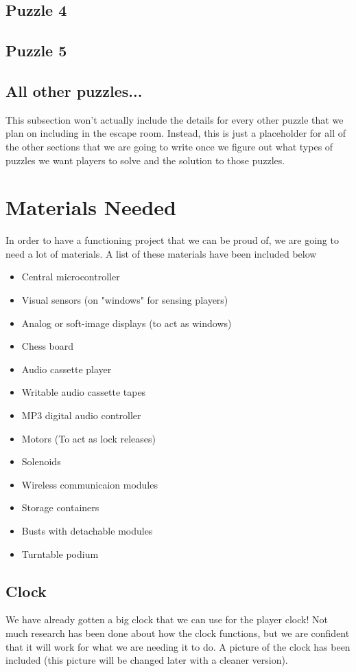 \documentclass[conference]{IEEEtran}
\begin{document}
\subsection{Puzzle 4}

\subsection{Puzzle 5}

\subsection{All other puzzles...}
This subsection won't actually include the details for every other puzzle that we plan on including
in the escape room. Instead, this is just a placeholder for all of the other sections that we are
going to write once we figure out what types of puzzles we want players to solve and the solution
to those puzzles.

\section{Materials Needed}
In order to have a functioning project that we can be proud of, we are going to need a lot of materials.
A list of these materials have been included below
\begin{itemize}
    \item Central microcontroller
    \item Visual sensors (on "windows" for sensing players)
    \item Analog or soft-image displays (to act as windows)
    \item Chess board
    \item Audio cassette player
    \item Writable audio cassette tapes
    \item MP3 digital audio controller
    \item Motors (To act as lock releases)
    \item Solenoids
    \item Wireless communicaion modules
    \item Storage containers
    \item Busts with detachable modules
    \item Turntable podium
\end{itemize}

\subsection*{Clock}
We have already gotten a big clock that we can use for the player clock! Not much
research has been done about how the clock functions, but we are confident that it will
work for what we are needing it to do. A picture of the clock has been included (this
picture will be changed later with a cleaner version).
\end{document}
